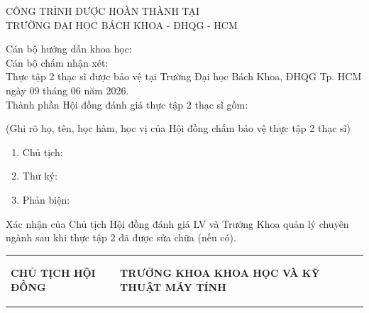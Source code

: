 \begin{boxA}
\begin{titlepage}
\begin{center}
    CÔNG TRÌNH ĐƯỢC HOÀN THÀNH TẠI\\
    TRƯỜNG ĐẠI HỌC BÁCH KHOA - ĐHQG - HCM
\end{center}

Cán bộ hướng dẫn khoa học:
\\

Cán bộ chấm nhận xét: 
\\

Thực tập 2 thạc sĩ được bảo vệ tại Trường Đại học Bách Khoa, ĐHQG Tp. HCM ngày 09 tháng 06 năm 2026.
\\

Thành phần Hội đồng đánh giá thực tập 2 thạc sĩ gồm:

(Ghi rõ họ, tên, học hàm, học vị của Hội đồng chấm bảo vệ thực tập 2 thạc sĩ)
\begin{enumerate}
    \item Chủ tịch: 
    \item Thư ký: 
    \item Phản biện: 
\end{enumerate}

Xác nhận của Chủ tịch Hội đồng đánh giá LV và Trưởng Khoa quản lý chuyên ngành sau khi thực tập 2 đã được sửa chữa (nếu có).

\vspace{1em}
\begin{tabular}
{p{} p{}}
     \begin{center}
         \textbf{CHỦ TỊCH HỘI ĐỒNG}
     \end{center}& \begin{center}
         \textbf{TRƯỞNG KHOA KHOA HỌC VÀ KỸ THUẬT MÁY TÍNH}
     \end{center}   \\
\end{tabular}
\end{titlepage}
\end{boxA}